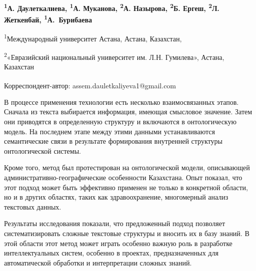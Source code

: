 
\begin{articleheader}

{\bfseries
\textsuperscript{1}А. Даулеткалиева\textsuperscript{\envelope },
\textsuperscript{1}А. Муканова,
\textsuperscript{2}А. Назырова,
\textsuperscript{2}Б. Ергеш,
\textsuperscript{2}Л. Жеткенбай,
\textsuperscript{1}А.~Бурибаева
}
\end{articleheader}

\begin{affiliation}
\textsuperscript{1}Международный университет Астана, Астана, Казахстан,

\textsuperscript{2}«Евразийский национальный университет им. Л.Н. Гумилева», Астана, Казахстан

\raggedright \textsuperscript{\envelope }Корреспондент-автор: assem.dauletkaliyeva1@gmail.com
\end{affiliation}

В процессе применения технологии есть несколько взаимосвязанных этапов.
Сначала из текста выбирается информация, имеющая смысловое значение.
Затем они приводятся в определенную структуру и включаются в
онтологическую модель. На последнем этапе между этими данными
устанавливаются семантические связи в результате формирования внутренней
структуры онтологической системы.

Кроме того, метод был протестирован на онтологической модели,
описывающей административно-географические особенности Казахстана. Опыт
показал, что этот подход может быть эффективно применен не только в
конкретной области, но и в других областях, таких как здравоохранение,
многомерный анализ текстовых данных.

Результаты исследования показали, что предложенный подход позволяет
систематизировать сложные текстовые структуры и вносить их в базу
знаний. В этой области этот метод может играть особенно важную роль в
разработке интеллектуальных систем, особенно в проектах, предназначенных
для автоматической обработки и интерпретации сложных знаний.

